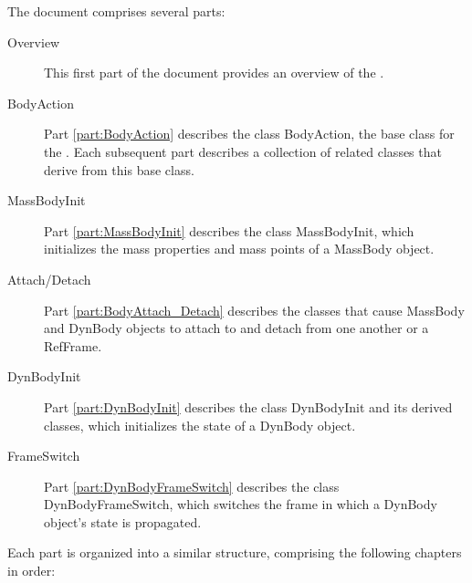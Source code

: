 The document comprises several parts:
\begin{description}
\item[Overview]
This first part of the document provides an
overview of the \ModelDesc.
\item[BodyAction]
Part \ref{part:BodyAction} describes the class BodyAction, the
base class for the \ModelDesc.
Each subsequent part describes a collection of related classes
that derive from this base class.
\item[MassBodyInit]
Part \ref{part:MassBodyInit} describes the class MassBodyInit, which
initializes the mass properties and mass points of a MassBody object.
\item[Attach/Detach]
Part \ref{part:BodyAttach_Detach} describes the classes that cause
MassBody and DynBody objects to attach to and detach from one another or a RefFrame.
\item[DynBodyInit]
Part \ref{part:DynBodyInit} describes the class DynBodyInit and its
derived classes, which initializes the state of a DynBody object.
\item[FrameSwitch]
Part \ref{part:DynBodyFrameSwitch} describes the class DynBodyFrameSwitch,
which switches the frame in which a DynBody object's state is propagated.
\end{description}

Each part is organized into a similar structure, comprising the following
chapters in order:

